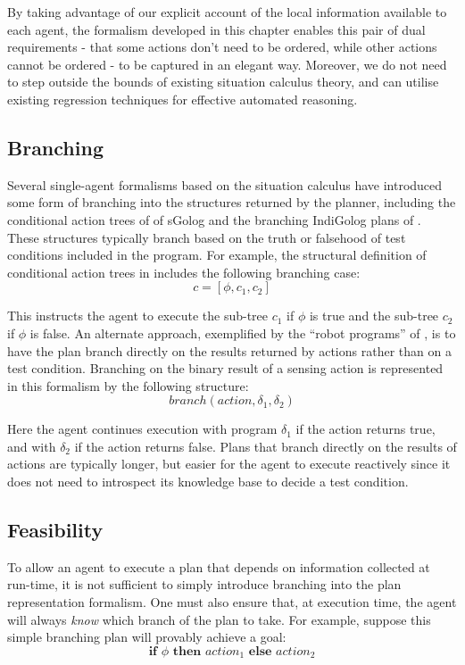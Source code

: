 By taking advantage of our explicit account of the local information
available to each agent, the formalism developed in this chapter enables
this pair of dual requirements - that some actions don't need to be ordered,
while other actions cannot be ordered - to be captured in an elegant
way. Moreover, we do not need to step outside the bounds of existing
situation calculus theory, and can utilise existing regression techniques
for effective automated reasoning.


\subsection{Branching}

Several single-agent formalisms based on the situation calculus have
introduced some form of branching into the structures returned by
the planner, including the conditional action trees of of sGolog \citep{lakemeyer99golog_cats}
and the branching IndiGolog plans of \citep{giacomo04sem_delib_indigolog}.
These structures typically branch based on the truth or falsehood
of test conditions included in the program. For example, the structural
definition of conditional action trees in \citep{lakemeyer99golog_cats}
includes the following branching case:\[
c=[\phi,c_{1},c_{2}]\]


This instructs the agent to execute the sub-tree $c_{1}$ if $\phi$
is true and the sub-tree $c_{2}$ if $\phi$ is false. An alternate
approach, exemplified by the {}``robot programs'' of \citet{levesque98what_robots_can_do},
is to have the plan branch directly on the results returned by actions
rather than on a test condition. Branching on the binary result of
a sensing action is represented in this formalism by the following
structure:\[
branch(action,\delta_{1},\delta_{2})\]


Here the agent continues execution with program $\delta_{1}$ if the
action returns true, and with $\delta_{2}$ if the action returns
false. Plans that branch directly on the results of actions are typically
longer, but easier for the agent to execute reactively since it does
not need to introspect its knowledge base to decide a test condition.


\subsection{Feasibility\label{sec:JointExec:BG:Feasibility}}

To allow an agent to execute a plan that depends on information collected
at run-time, it is not sufficient to simply introduce branching into
the plan representation formalism. One must also ensure that, at execution
time, the agent will always \emph{know} which branch of the plan to
take. For example, suppose this simple branching plan will provably
achieve a goal:\[
\mathbf{if}\,\,\phi\,\,\mathbf{then}\,\, action_{1}\,\,\mathbf{else\,}\, action_{2}\]


